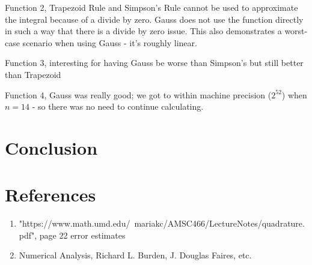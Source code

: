 \documentclass[12pt]{article}
\begin{document}
Function 2, Trapezoid Rule and Simpson's Rule cannot be used to approximate the integral
because of a divide by zero. Gauss does not use the function directly in such a way
that there is a divide by zero issue. This also demonstrates a worst-case scenario
when using Gauss - it's roughly linear.

Function 3, interesting for having Gauss be worse than Simpson's but still better than
Trapezoid

Function 4, Gauss was really good; we got to within machine precision ($2^52$) when $n = 14$ - so
there was no need to continue calculating.

\section{Conclusion}

\newpage
\section{References}

\begin{enumerate}
	\item "https://www.math.umd.edu/~mariakc/AMSC466/LectureNotes/quadrature.pdf", page 22 error estimates
	\item Numerical Analysis, Richard L. Burden, J. Douglas Faires, etc.
\end{enumerate}
\end{document}
